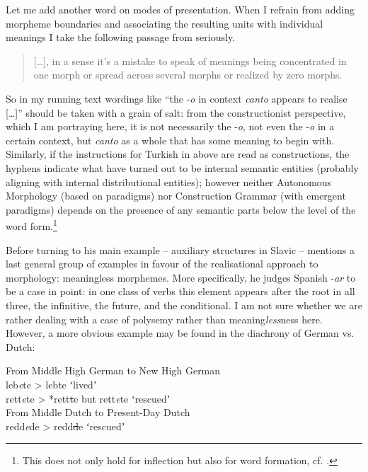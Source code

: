 \documentclass[output=paper]{langsci/langscibook}
\begin{document}
Let me add another word on modes of presentation. When I refrain from adding morpheme boundaries and associating the resulting units with individual meanings I take the following passage from \citet{Spencer2001} seriously.


\begin{quote}
[…], in a sense it’s a mistake to speak of meanings being concentrated in one morph or spread across several morphs or realized by zero morphs. \citep[287]{Spencer2001}
\end{quote}

So in my running text wordings like “the \nobreakdash-\textit{o} in context  \textit{canto} appears to realise […]” should be taken with a grain of salt: from the constructionist perspective, which I am portraying here, it is not necessarily the \nobreakdash-\textit{o}, not even the \nobreakdash-\textit{o} in a certain context, but \textit{canto} as a whole that has some meaning to begin with. Similarly, if the instructions for Turkish in  above are read as constructions, the hyphens indicate what have turned out to be internal semantic entities (probably aligning with internal distributional entities); however neither Autonomous Morphology (based on paradigms) nor Construction Grammar (with emergent paradigms) depends on the presence of any semantic parts below the level of the word form.\footnote{This does not only hold for inflection but also for word formation, cf. \citet[428]{Booij2016}.}

Before turning to his main example – auxiliary structures in Slavic – \citet[287]{Spencer2001} mentions a last general group of examples in favour of the realisational approach to morphology: meaningless morphemes. More specifically, he judges Spanish \nobreakdash-\textit{ar} to be a case in point: in one class of verbs this element appears after the root in all three, the infinitive, the future, and the conditional. I am not sure whether we are rather dealing with a case of polysemy rather than meaning\textit{less}ness here. However, a more obvious example may be found in the diachrony of German vs. Dutch:

\ea \label{ex:reiner:10} 
{From Middle High German to New High German \citep[200–201]{Roberge1985}}\\
leb\textit{e}te > lebte \textup{ʻlivedʼ}\\
  rett\textit{e}te  \textup{>  *}rett\sout{t}e \textup{but} rett\textit{e}te \textup{ʻrescuedʼ}\\
\ex\label{ex:reiner:11}
{From Middle Dutch to Present-Day Dutch \citep[200–201]{Roberge1985}}\\
redd\textit{e}de > redd\sout{d}e \textup{ʻrescuedʼ}
\z
\end{document}
